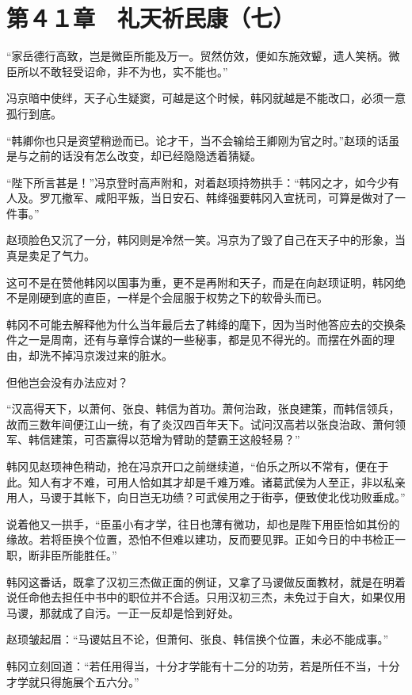 \section{第４１章　礼天祈民康（七）}

“家岳德行高致，岂是微臣所能及万一。贸然仿效，便如东施效颦，遗人笑柄。微臣所以不敢轻受诏命，非不为也，实不能也。”

冯京暗中使绊，天子心生疑窦，可越是这个时候，韩冈就越是不能改口，必须一意孤行到底。

“韩卿你也只是资望稍逊而已。论才干，当不会输给王卿刚为官之时。”赵顼的话虽是与之前的话没有怎么改变，却已经隐隐透着猜疑。

“陛下所言甚是！”冯京登时高声附和，对着赵顼持笏拱手：“韩冈之才，如今少有人及。罗兀撤军、咸阳平叛，当日安石、韩绛强要韩冈入宣抚司，可算是做对了一件事。”

赵顼脸色又沉了一分，韩冈则是冷然一笑。冯京为了毁了自己在天子中的形象，当真是卖足了气力。

这可不是在赞他韩冈以国事为重，更不是再附和天子，而是在向赵顼证明，韩冈绝不是刚硬到底的直臣，一样是个会屈服于权势之下的软骨头而已。

韩冈不可能去解释他为什么当年最后去了韩绛的麾下，因为当时他答应去的交换条件之一是周南，还有与章惇合谋的一些秘事，都是见不得光的。而摆在外面的理由，却洗不掉冯京泼过来的脏水。

但他岂会没有办法应对？

“汉高得天下，以萧何、张良、韩信为首功。萧何治政，张良建策，而韩信领兵，故而三数年间便江山一统，有了炎汉四百年天下。试问汉高若以张良治政、萧何领军、韩信建策，可否赢得以范增为臂助的楚霸王这般轻易？”

韩冈见赵顼神色稍动，抢在冯京开口之前继续道，“伯乐之所以不常有，便在于此。知人有才不难，可用人恰如其才却是千难万难。诸葛武侯为人至正，非以私亲用人，马谡于其帐下，向日岂无功绩？可武侯用之于街亭，便致使北伐功败垂成。”

说着他又一拱手，“臣虽小有才学，往日也薄有微功，却也是陛下用臣恰如其份的缘故。若将臣换个位置，恐怕不但难以建功，反而要见罪。正如今日的中书检正一职，断非臣所能胜任。”

韩冈这番话，既拿了汉初三杰做正面的例证，又拿了马谡做反面教材，就是在明着说任命他去担任中书中的职位并不合适。只用汉初三杰，未免过于自大，如果仅用马谡，那就成了自污。一正一反却是恰到好处。

赵顼皱起眉：“马谡姑且不论，但萧何、张良、韩信换个位置，未必不能成事。”

韩冈立刻回道：“若任用得当，十分才学能有十二分的功劳，若是所任不当，十分才学就只得施展个五六分。”

